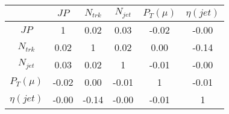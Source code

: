 \begin{tabular}{|c|c|c|c|c|c|} 
\hline
 & $JP$ & $N_{trk}$ & $N_{jet}$ & $P_{T} (\mu)$ & $\eta (jet)$ \\ \hline
$JP$ & 1 & 0.02 & 0.03 & -0.02 & -0.00 \\
$N_{trk}$ & 0.02 & 1 & 0.02 & 0.00 & -0.14 \\
$N_{jet}$ & 0.03 & 0.02 & 1 & -0.01 & -0.00 \\
$P_{T} (\mu)$ & -0.02 & 0.00 & -0.01 & 1 & -0.01 \\
$\eta (jet)$ & -0.00 & -0.14 & -0.00 & -0.01 & 1 \\
\hline 
\end{tabular} 


